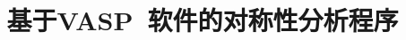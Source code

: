 \documentclass{article}      %
\begin{document}
\graphicspath{{Figures/}}
%
\renewcommand{\abstractname}{\small{\CJKfamily{hei} 摘\quad 要}} %
\renewcommand{\refname}{\centering\CJKfamily{hei} 参考文献}
\renewcommand{\figurename}{{\bf Fig}.}
\renewcommand{\tablename}{{\bf Tab}.}

\makeatletter
\long{}
\makeatother

\newcommand{\keywords}[1]{{\hspace{0\ccwd}\small{\CJKfamily{hei} 关键词:}{\hspace{2ex}{#1}}\bigskip}}



\title{基于\rm{VASP~}软件的对称性分析程序}

\author{
\small
\small
}
\date{}					%
\maketitle
\end{document}
